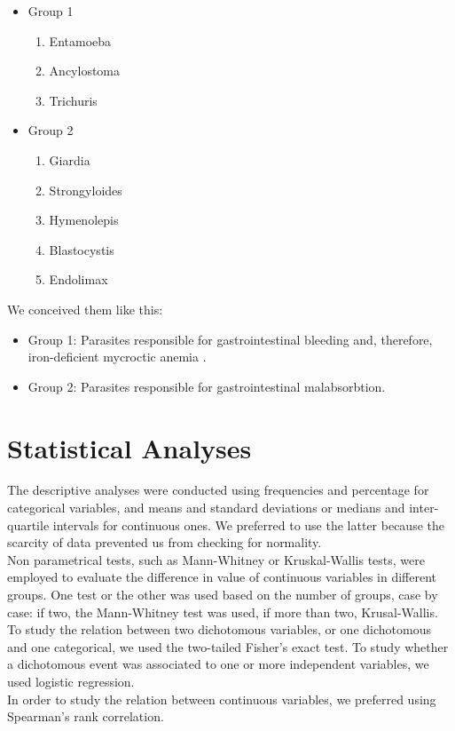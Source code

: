 \begin{itemize}
	\item Group 1
		\begin{enumerate}
			\item Entamoeba
			\item Ancylostoma
			\item Trichuris
		\end{enumerate}
	\item Group 2
		\begin{enumerate}
			\item Giardia
			\item Strongyloides
			\item Hymenolepis
			\item Blastocystis
			\item Endolimax
		\end{enumerate}
\end{itemize}

We conceived them like this:

\begin{itemize}
	\item Group 1: Parasites responsible for gastrointestinal bleeding and, therefore, iron-deficient mycroctic anemia .
	\item Group 2: Parasites responsible for gastrointestinal malabsorbtion.
\end{itemize}


\section{Statistical Analyses}\label{sec:statisticalanalyses}
The descriptive analyses were conducted using frequencies and percentage for categorical variables, and means and standard deviations or medians and inter-quartile intervals for continuous ones. We preferred to use the latter because the scarcity of data prevented us from checking for normality.\\
Non parametrical tests, such as Mann-Whitney or Kruskal-Wallis tests, were employed to evaluate the difference in value of continuous variables in different groups. One test or the other was used based on the number of groups, case by case: if two, the Mann-Whitney test was used, if more than two, Krusal-Wallis. To study the relation between two dichotomous variables, or one dichotomous and one categorical, we used the two-tailed Fisher's exact test. To study whether a dichotomous event was associated to one or more independent variables, we used logistic regression.\\
In order to study the relation between continuous variables, we preferred using Spearman's rank correlation.

